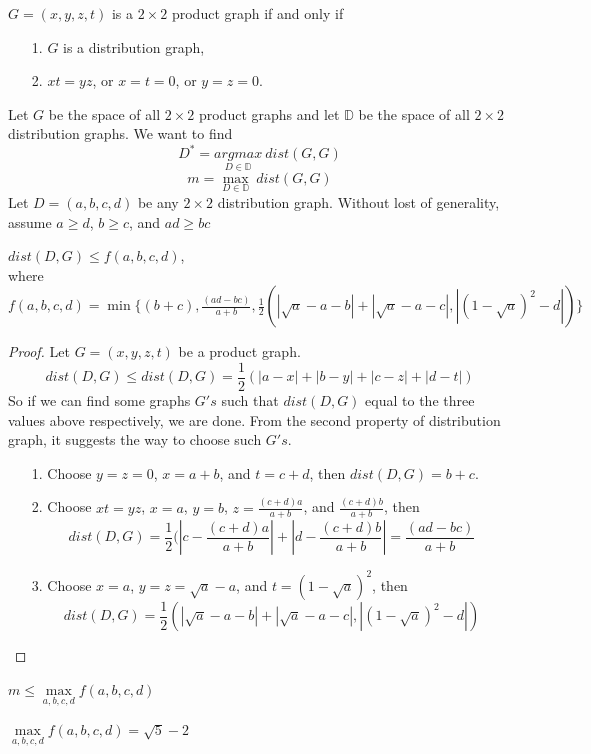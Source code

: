 \begin{definition}
$G = (x,y,z,t)$ is a $2 \times 2$ product graph if and only if 
\begin{itemize}
\item [1.] $G$ is a distribution graph,
\item [2.] $xt = yz$, or $x = t = 0$, or $y =z = 0$.
\end{itemize}
\end{definition}

 
Let $G$ be the space of all $2 \times 2$ product graphs and let $\mathbb{D}$ be the space of all $2 \times 2$ distribution graphs. We want to find 
$$ D^* = \underset{D \in \mathbb{D}} {argmax} \ dist(G, G)$$
$$m = \underset{D \in \mathbb{D}} {\max} \ dist(G, G)$$
Let $D = (a,b,c,d)$ be any $2 \times 2$ distribution graph. Without lost of generality, assume $a \geq d$,  $b \geq c$, and $ad \geq bc$ 

\begin{claim}
$dist(D, G) \leq f(a,b,c,d)$, \\
where $f(a,b,c,d) = \min \{(b+c), \frac{(ad - bc)}{a+b},
\frac{1}{2}(| \sqrt{a} - a - b| + |\sqrt{a} - a - c|, |(1 - \sqrt{a})^2 -d|) \}$
\end{claim}

\begin{proof}
Let $G = (x,y,z,t)$ be a product graph.  
$$dist(D,G) \leq dist(D,G) = \frac{1}{2} (|a-x| + |b-y| + |c-z| + |d-t|)$$
So if we can find some graphs $G's$ such that $dist(D,G)$ equal to the three values above respectively, we are done. From the second property of distribution graph, it suggests the way to choose such $G's$.
\begin{itemize}
\item [1.] Choose $y = z =0$, $x = a+b$, and $t = c+d$, then $dist(D,G) = b+c$.
\item [2.] Choose $xt = yz$, $x = a$, $y =b$, $z = \frac{(c+d)a}{a+b}$, and $\frac{(c+d)b}{a+b}$, then 
$$dist(D,G) = \frac{1}{2}(|c - \frac{(c+d)a}{a+b}| + |d - \frac{(c+d)b}{a+b}|
= \frac{(ad - bc)}{a+b} $$
\item [3.] Choose $x = a$, $y = z = \sqrt{a} - a$, and $t = (1 - \sqrt{a})^2$, then 
$$dist(D,G) = \frac{1}{2}(| \sqrt{a} - a - b| + |\sqrt{a} - a - c|, |(1 - \sqrt{a})^2 -d|) $$
\end{itemize}
\end{proof}

\begin{claim}
$m \leq \underset {a,b,c,d} {\max} f(a,b,c,d)$
\end{claim} 
\begin{claim} 
$\underset {a,b,c,d} {\max} f(a,b,c,d) = \sqrt{5} -2$
\end{claim}

